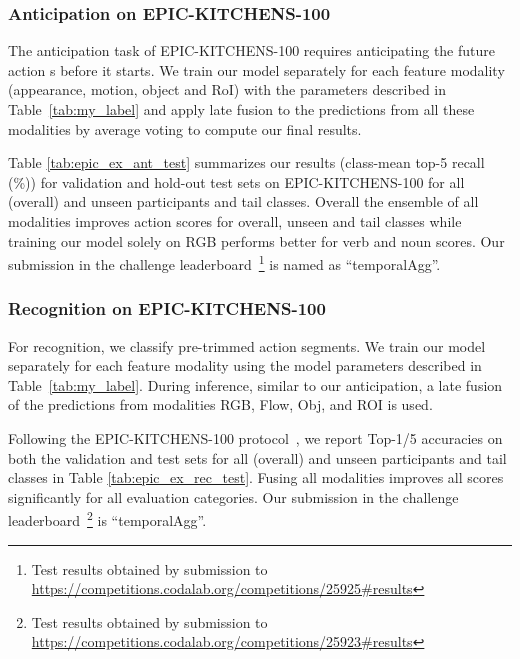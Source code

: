 \documentclass[10pt,twocolumn,letterpaper]{article}
\begin{document}
 
\subsubsection{Anticipation on EPIC-KITCHENS-100}\label{sec:daily_ant}
The anticipation task of EPIC-KITCHENS-100 requires anticipating the future action s before it starts. 
We train our model separately for each feature modality (appearance, motion, object and RoI) with the parameters described in Table~\ref{tab:my_label} and apply late fusion to the predictions from all these modalities by average voting to compute our final results. 


Table \ref{tab:epic_ex_ant_test} summarizes our results (class-mean top-5 recall (\%)) for validation and hold-out test sets on EPIC-KITCHENS-100 for all (overall) and unseen participants and tail classes. 
Overall the ensemble of all modalities improves action scores for overall, unseen and tail classes while training our model solely on RGB performs better for verb and noun scores. 
Our submission in the challenge leaderboard~\footnote{Test results obtained by submission to {\url{https://competitions.codalab.org/competitions/25925\#results}}} is named as ``temporalAgg''. 
 
 
\subsubsection{Recognition on EPIC-KITCHENS-100}\label{sec:daily_rec} 
For recognition, we classify pre-trimmed action segments.
We train our model separately for each feature modality using the model parameters described in Table~\ref{tab:my_label}. 
During inference, similar to our anticipation, a late fusion of the predictions from modalities RGB, Flow, Obj, and ROI is used. 


Following the EPIC-KITCHENS-100 protocol~\cite{damen2020rescaling}, we report Top-1/5 accuracies on both the validation and test sets for all (overall) and unseen participants and tail classes in Table \ref{tab:epic_ex_rec_test}. 
Fusing all modalities improves all scores significantly for all evaluation categories. 
Our submission in the challenge leaderboard~\footnote{Test results obtained by submission to {\url{https://competitions.codalab.org/competitions/25923\#results}}} is ``temporalAgg''. 
 

{\small


}
\end{document}
